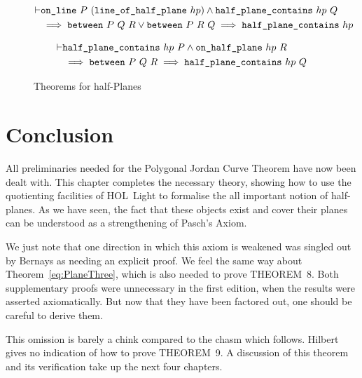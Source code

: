 \begin{figure}
  \begin{equation}\label{eq:betOnHalfPlane1}
    \begin{split}
      \vdash&\texttt{on\_line}\ P\ (\texttt{line\_of\_half\_plane}\ hp) \wedge \texttt{half\_plane\_contains}\ hp\ Q\\
      &\implies \texttt{between}\ P\ Q\ R \vee \texttt{between}\ P\ R\ Q \implies \texttt{half\_plane\_contains}\ hp
    \end{split}
  \end{equation}
  
  \begin{equation}\label{eq:betOnHalfPlane2}
    \begin{split}
      \vdash&\texttt{half\_plane\_contains}\ hp\ P \wedge \texttt{on\_half\_plane}\ hp\ R\\
      &\implies \texttt{between}\ P\ Q\ R \implies \texttt{half\_plane\_contains}\ hp\ Q
    \end{split}
  \end{equation}
\caption{Theorems for half-Planes}
\label{fig:HalfPlanesAdditional}
\end{figure}
\section{Conclusion}
All preliminaries needed for the Polygonal Jordan Curve Theorem have now been dealt with. This chapter completes the necessary theory, showing how to use the quotienting facilities of HOL~Light to formalise the all important notion of half-planes. As we have seen, the fact that these objects exist and cover their planes can be understood as a strengthening of Pasch's Axiom.

We just note that one direction in which this axiom is weakened  was singled out by Bernays as needing an explicit proof. We feel the same way about Theorem~\ref{eq:PlaneThree}, which is also needed to prove THEOREM~8. Both supplementary proofs were unnecessary in the first edition, when the results were asserted axiomatically. But now that they have been factored out, one should be careful to derive them.

This omission is barely a chink compared to the chasm which follows. Hilbert gives no indication of how to prove THEOREM~9. A discussion of this theorem and its verification take up the next four chapters.


